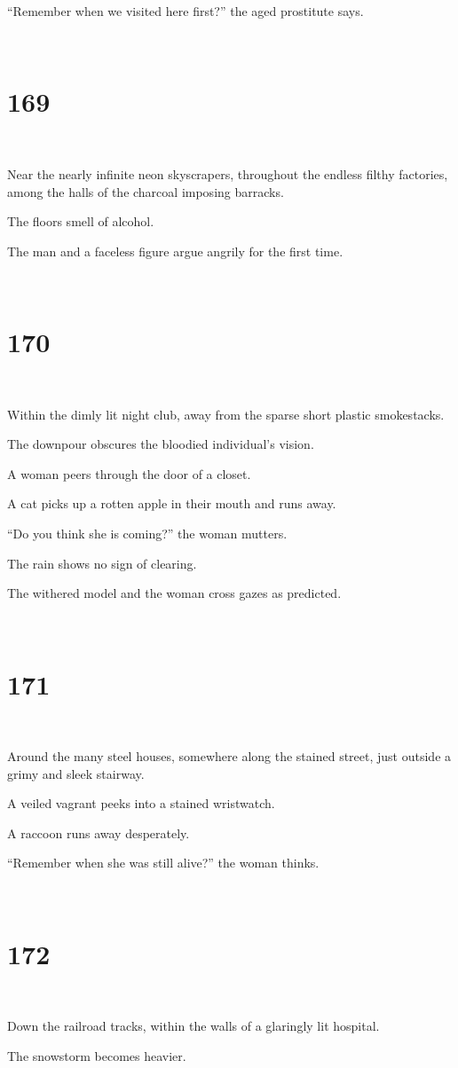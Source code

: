 \documentclass{report}
\begin{document}
``Remember when we visited here first?'' the aged prostitute says.

~
\chapter*{169}
~

Near the nearly infinite neon skyscrapers, throughout the endless filthy factories, among the halls of the charcoal imposing barracks.

The floors smell of alcohol.

The man and a faceless figure argue angrily for the first time.

~
\chapter*{170}
~

Within the dimly lit night club, away from the sparse short plastic smokestacks.

The downpour obscures the bloodied individual's vision.

A woman peers through the door of a closet.

A cat picks up a rotten apple in their mouth and runs away.

``Do you think she is coming?'' the woman mutters.

The rain shows no sign of clearing.

The withered model and the woman cross gazes as predicted.

~
\chapter*{171}
~

Around the many steel houses, somewhere along the stained street, just outside a grimy and sleek stairway.

A veiled vagrant peeks into a stained wristwatch.

A raccoon runs away desperately.

``Remember when she was still alive?'' the woman thinks.

~
\chapter*{172}
~

Down the railroad tracks, within the walls of a glaringly lit hospital.

The snowstorm becomes heavier.
\end{document}
